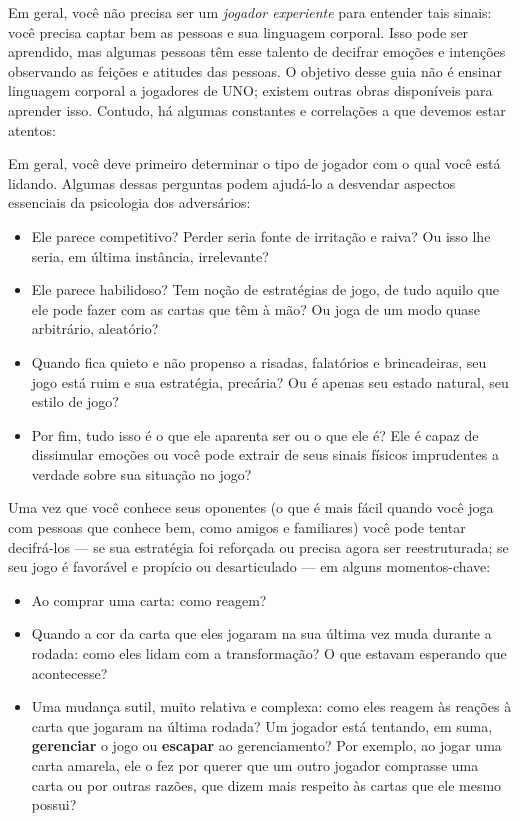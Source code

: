 Em geral, você não precisa ser um \emph{jogador experiente} para entender tais sinais: você precisa captar bem as pessoas e sua linguagem corporal. Isso pode ser aprendido, mas algumas pessoas têm esse talento de decifrar emoções e intenções observando as feições e atitudes das pessoas. O objetivo desse guia não é ensinar linguagem corporal a jogadores de UNO; existem outras obras disponíveis para aprender isso. Contudo, há algumas constantes e correlações a que devemos estar atentos:

Em geral, você deve primeiro determinar o tipo de jogador com o qual você está lidando. Algumas dessas perguntas podem ajudá-lo a desvendar aspectos essenciais da psicologia dos adversários:

\begin{itemize}
\item{Ele parece competitivo? Perder seria fonte de irritação e raiva? Ou isso lhe seria, em última instância, irrelevante?}
\item{Ele parece habilidoso? Tem noção de estratégias de jogo, de tudo aquilo que ele pode fazer com as cartas que têm à mão? Ou joga de um modo quase arbitrário, aleatório?}
\item{Quando fica quieto e não propenso a risadas, falatórios e brincadeiras, seu jogo está ruim e sua estratégia, precária? Ou é apenas seu estado natural, seu estilo de jogo?}
\item{Por fim, tudo isso é o que ele aparenta ser ou o que ele é? Ele é capaz de dissimular emoções ou você pode extrair de seus sinais físicos imprudentes a verdade sobre sua situação no jogo?}
\end{itemize}

Uma vez que você conhece seus oponentes (o que é mais fácil quando você joga com pessoas que conhece bem, como amigos e familiares) você pode tentar decifrá-los --- se sua estratégia foi reforçada ou precisa agora ser reestruturada; se seu jogo é favorável e propício ou desarticulado --- em alguns momentos-chave:

\begin{itemize}
\item{Ao comprar uma carta: como reagem?}
\item{Quando a cor da carta que eles jogaram na sua última vez muda durante a rodada: como eles lidam com a transformação? O que estavam esperando que acontecesse?}
\item{Uma mudança sutil, muito relativa e complexa: como eles reagem às reações à carta que jogaram na última rodada? Um jogador está tentando, em suma, \textbf{gerenciar} o jogo ou \textbf{escapar} ao gerenciamento? Por exemplo, ao jogar uma carta amarela, ele o fez por querer que um outro jogador comprasse uma carta ou por outras razões, que dizem mais respeito às cartas que ele mesmo possui?}
\end{itemize}

